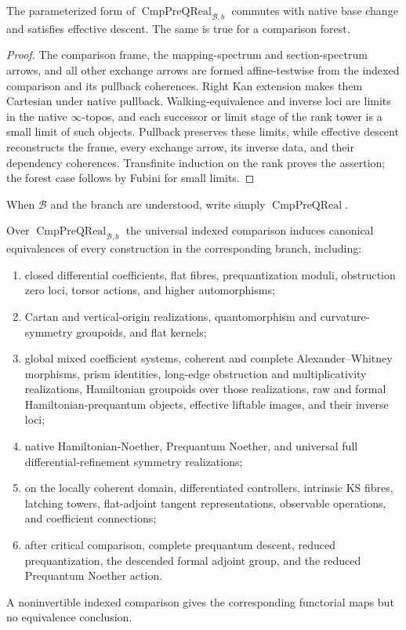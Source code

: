 \begin{proposition}
\label{prop:prequantum-indexed-comparison-locality}
The parameterized form of
$\operatorname{CmpPreQReal}_{\mathcal B,b}$ commutes with native base change and
satisfies effective descent.  The same is true for a comparison forest.
\end{proposition}

\begin{proof}
The comparison frame, the mapping-spectrum and section-spectrum arrows, and all
other exchange arrows are formed affine-testwise from the indexed comparison
and its pullback coherences.  Right Kan extension makes them Cartesian under
native pullback.  Walking-equivalence and inverse loci are limits in the native
$\infty$-topos, and each successor or limit stage of the rank tower is a small
limit of such objects.  Pullback preserves these limits, while effective descent
reconstructs the frame, every exchange arrow, its inverse data, and their
dependency coherences.  Transfinite induction on the rank proves the assertion;
the forest case follows by Fubini for small limits.
\end{proof}

When $\mathcal B$ and the branch are understood, write simply
$\operatorname{CmpPreQReal}$.

\begin{theorem}
\label{thm:prequantum-comparison-transport}
Over $\operatorname{CmpPreQReal}_{\mathcal B,b}$ the universal indexed comparison
induces canonical equivalences of every construction in the corresponding
branch, including:
\begin{enumerate}
\item closed differential coefficients, flat fibres, prequantization moduli,
      obstruction zero loci, torsor actions, and higher automorphisms;
\item Cartan and vertical-origin realizations, quantomorphism and
      curvature-symmetry groupoids, and flat kernels;
\item global mixed coefficient systems, coherent and complete
      Alexander--Whitney morphisms, prism identities, long-edge obstruction and
      multiplicativity realizations, Hamiltonian groupoids over those
      realizations, raw and formal Hamiltonian-prequantum objects, effective
      liftable images, and their inverse loci;
\item native Hamiltonian-Noether, Prequantum Noether, and universal full
      differential-refinement symmetry realizations;
\item on the locally coherent domain, differentiated controllers, intrinsic KS
      fibres, latching towers, flat-adjoint tangent representations, observable
      operations, and coefficient connections;
\item after critical comparison, complete prequantum descent, reduced
      prequantization, the descended formal adjoint group, and the reduced
      Prequantum Noether action.
\end{enumerate}
A noninvertible indexed comparison gives the corresponding functorial maps but
no equivalence conclusion.
\end{theorem}

